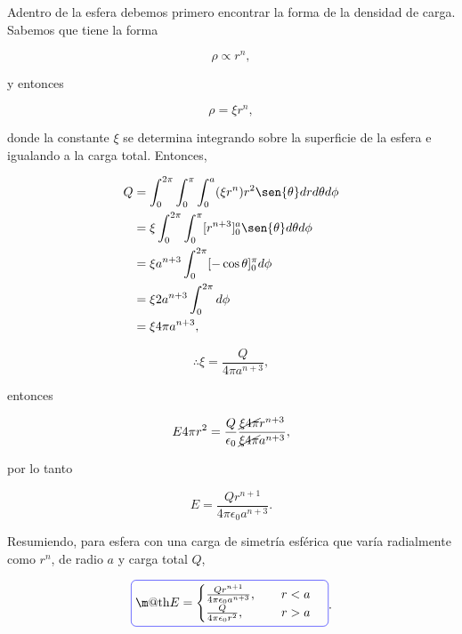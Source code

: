 \documentclass[a4paper,10pt]{article}
\makeatletter
\numberwithin{equation}{section}
\newcommand*{\boxcolor}{blue}
\renewcommand{\boxed}[1]{\textcolor{\boxcolor}{%
\tikz[baseline={([yshift=-1ex]current bounding box.center)}] \node [rectangle, minimum width=1ex,rounded corners,draw] {\normalcolor\m@th$\displaystyle#1$};}}
\makeatother
\begin{document}
Adentro de la esfera debemos primero encontrar la forma de la densidad de carga. Sabemos 
que tiene la forma 

\begin{equation}
 \rho \propto r^n,
\end{equation}

y entonces 

\begin{equation}
 \rho = \xi r^n,
\end{equation}

donde la constante $\xi$ se determina integrando sobre la superficie de la 
esfera e igualando a la carga total. Entonces, 

\begin{align*}
 Q &= \int_0^{2\pi} \int_0^\pi \int_0^a (\xi r^n) r^2 \sen{\theta}drd\theta d\phi \\
   &= \xi \int_0^{2\pi} \int_0^\pi [r^{n+3}]_0^a \sen{\theta}d\theta d\phi \\
   &= \xi a^{n+3} \int_0^{2\pi} [-\cos{\theta}]_0^\pi d\phi \\
   &= \xi 2a^{n+3} \int_0^{2\pi} d\phi \\
   &= \xi 4\pi a^{n+3},
\end{align*}

\begin{equation}
 \therefore \xi = \frac{Q}{4\pi a^{n+3}},
\end{equation}

entonces 

\begin{equation}
 E4\pi r^2 = \frac{Q}{\epsilon_0}\frac{\cancel{\xi4\pi} 
 r^{n+3}}{\cancel{\xi4\pi} a^{n+3}},
\end{equation}

por lo tanto

\begin{equation}
 E = \frac{Qr^{n+1}}{4\pi\epsilon_0a^{n+3}}.
\end{equation}

Resumiendo, para esfera con una carga de simetría esférica que varía 
radialmente como $r^n$, de radio $a$ y carga total $Q$,

\begin{equation}
\boxed{
  E =\begin{cases}
	      \frac{Qr^{n+1}}{4\pi\epsilon_0a^{n+3}}, \quad  \quad r < a \\
	      \frac{Q}{4\pi \epsilon_0 r^2}, \quad \qquad  r > a
	       \end{cases}}.
\end{equation}
\end{document}
